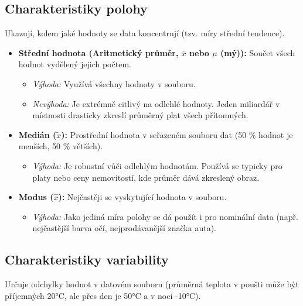 \subsection{Charakteristiky polohy}
Ukazují, kolem jaké hodnoty se data koncentrují (tzv. míry střední tendence).

\begin{itemize}
    \item \textbf{Střední hodnota (Aritmetický průměr, $\bar{x}$ nebo $\mu$ (mý)):} 
    Součet všech hodnot vydělený jejich počtem.
    \begin{itemize}
        \item \textit{Výhoda:} Využívá všechny hodnoty v souboru.
        \item \textit{Nevýhoda:} Je extrémně citlivý na odlehlé hodnoty. Jeden miliardář v místnosti drasticky zkreslí průměrný plat všech přítomných.
    \end{itemize}
    
    \item \textbf{Medián ($\tilde{x}$):} 
    Prostřední hodnota v seřazeném souboru dat (50 \% hodnot je menších, 50 \% větších).
    \begin{itemize}
        \item \textit{Výhoda:} Je robustní vůči odlehlým hodnotám. Používá se typicky pro platy nebo ceny nemovitostí, kde průměr dává zkreslený obraz.
    \end{itemize}
    
    \item \textbf{Modus ($\hat{x}$):} 
    Nejčastěji se vyskytující hodnota v souboru.
    \begin{itemize}
        \item \textit{Výhoda:} Jako jediná míra polohy se dá použít i pro nominální data (např. nejčastější barva očí, nejprodávanější značka auta).
    \end{itemize}
\end{itemize}

\subsection{Charakteristiky variability}
Určuje odchylky hodnot v datovém souboru (průměrná teplota v poušti může být příjemných 20°C, ale přes den je 50°C a v noci -10°C).

